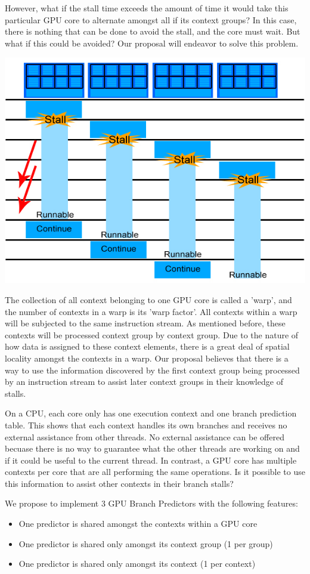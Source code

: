 \documentclass[conference]{IEEEtran}
\begin{document}
However, what if the stall time exceeds the amount of time it would take this particular GPU core to alternate amongst all if its context groups?  In this case, there is nothing that can be done to avoid the stall, and the core must wait.  But what if this could be avoided?  Our proposal will endeavor to solve this problem.
\begin{center}
	\includegraphics[width=.45\textwidth]{GPU-context-interleaving-2.jpg}
\end{center}

The collection of all context belonging to one GPU core is called a 'warp', and the number of contexts in a warp is  its 'warp factor'.  All contexts within a warp will be subjected to the same instruction stream.  As mentioned before, these contexts will be processed context group by context group.  Due to the nature of how data is assigned to these context elements, there is a great deal of spatial locality amongst the contexts in a warp.  Our proposal believes that there is a way to use the information discovered by the first context group being processed by an instruction stream to assist later context groups in their knowledge of stalls.

On a CPU, each core only has one execution context and one branch prediction table.  This shows that each context handles its own branches and receives no external assistance from other threads.  No external assistance can be offered becuase there is no way to guarantee what the other threads are working on and if it could be useful to the current thread.  In contrast, a GPU core has multiple contexts per core that are all performing the same operations.  Is it possible to use this information to assist other contexts in their branch stalls?

We propose to implement 3 GPU Branch Predictors with the following features:
\begin{itemize}
	\item One predictor is shared amongst the contexts within a GPU core
	\item One predictor is shared only amongst its context group (1 per group)
	\item One predictor is shared only amongst its context (1 per context)
\end{itemize}
\end{document}
